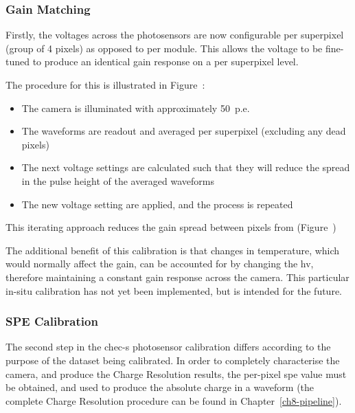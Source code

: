 \subsubsection{Gain Matching}

Firstly, the voltages across the photosensors are now configurable per superpixel (group of 4 pixels)  as opposed to per module. This allows the voltage to be fine-tuned to produce an identical gain response on a per superpixel level.

The procedure for this is illustrated in Figure~:
\begin{itemize}
	\item The camera is illuminated with approximately 50~p.e.
	\item The waveforms are readout and averaged per superpixel (excluding any dead pixels)
	\item The next voltage settings are calculated such that they will reduce the spread in the pulse height of the averaged waveforms
	\item The new voltage setting are applied, and the process is repeated
\end{itemize}
This iterating approach reduces the gain spread between pixels from  (Figure~)


The additional benefit of this calibration is that changes in temperature, which would normally affect the gain, can be accounted for by changing the \gls{hv}, therefore maintaining a constant gain response across the camera. This particular in-situ calibration has not yet been implemented, but is intended for the future.


\subsubsection{SPE Calibration}

The second step in the \gls{chec-s} photosensor calibration differs according to the purpose of the dataset being calibrated. In order to completely characterise the camera, and produce the Charge Resolution results, the per-pixel \gls{spe} value must be obtained, and used to produce the absolute charge in a waveform (the complete Charge Resolution procedure can be found in Chapter~\ref{ch8-pipeline}).

